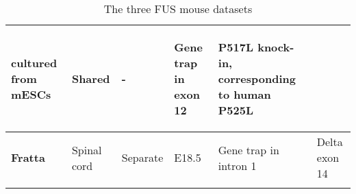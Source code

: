 \begin{longtable}[]{@{}llllll@{}}
\begin{minipage}[t]{0.14\columnwidth}
		{cultured from mESCs}\strut
	\end{minipage} & \begin{minipage}[t]{0.12\columnwidth}\raggedright\strut
		{Shared}\strut
	\end{minipage} & \begin{minipage}[t]{0.10\columnwidth}\raggedright\strut
		{-}\strut
	\end{minipage} & \begin{minipage}[t]{0.16\columnwidth}\raggedright\strut
		{Gene trap in exon 12}
		
		{ \footnotesize\citep{Hicks2000} }\strut
	\end{minipage} & \begin{minipage}[t]{0.16\columnwidth}\raggedright\strut
		{P517L knock-in,}
		{corresponding to human P525L}
		{\footnotesize\citep{Conte2012}}\strut
	\end{minipage}\tabularnewline\hline
	\begin{minipage}[t]{0.16\columnwidth}\raggedright\strut
		{\textbf{Fratta}}\strut
	\end{minipage} & \begin{minipage}[t]{0.14\columnwidth}\raggedright\strut
		{Spinal cord}\strut
	\end{minipage} & \begin{minipage}[t]{0.12\columnwidth}\raggedright\strut
		{Separate}\strut
	\end{minipage} & \begin{minipage}[t]{0.10\columnwidth}\raggedright\strut
		{E18.5}\strut
	\end{minipage} & \begin{minipage}[t]{0.16\columnwidth}\raggedright\strut
		{Gene trap in intron 1}\strut
	\end{minipage} & \begin{minipage}[t]{0.16\columnwidth}\raggedright\strut
		{Delta exon 14 }
		{\footnotesize\citep{Devoy2017}}  \strut
	\end{minipage}\tabularnewline
	\bottomrule
	\caption{The three FUS mouse datasets}
	\label{tab:fus_datasets}
\end{longtable}


